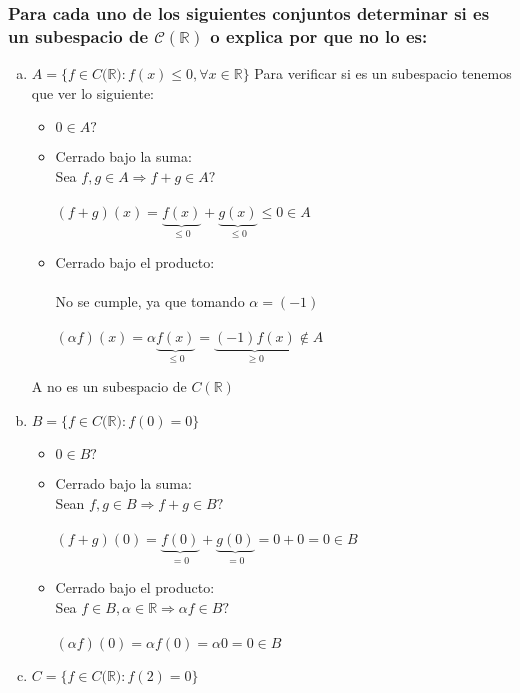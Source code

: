 \documentclass{article}
\begin{document}
\subsubsection{Para cada uno de los siguientes conjuntos determinar si es un subespacio de $\mathcal{C}(\mathbb{R})$ o 
explica por que no lo es: }
\begin{enumerate}[a.]
	\item
		$A = \{ f \in C(\mathbb{R)} : f(x) \leq 0, \forall x \in \mathbb{R} \}$
			Para verificar si es un subespacio tenemos que ver lo siguiente:
			\begin{itemize}
				\item $0 \in A?$
				\item
					Cerrado bajo la suma: \\
					Sea $f,g \in A \Rightarrow f+g \in A?$ \\ \\
					$(f+g)(x) = \underbrace{f(x)}_{\leq 0} + \underbrace{g(x)}_{\leq 0} \leq 0 \in A $
				\item 
					Cerrado bajo el producto: \\ \\
					No se cumple, ya que tomando $\alpha = (-1)$ \\ \\
					$(\alpha f)(x) = \alpha \underbrace{f(x)}_{\leq 0} = \underbrace{(-1)f(x)}_{\geq 0} \not \in A$
			\end{itemize}
			A no es un subespacio de $C(\mathbb{R})$
	\item
		$B = \{ f \in C(\mathbb{R)} : f(0) = 0 \}$
		\begin{itemize}
			\item 
				$0 \in B?$
			\item 
				Cerrado bajo la suma: \\
				Sean $f,g \in B \Rightarrow f+g \in B?$ \\ \\
				$(f+g)(0) = \underbrace{f(0)}_{=0} + \underbrace{g(0)}_{=0} = 0+0 = 0 \in B$
			\item 
				Cerrado bajo el producto: \\
				Sea $f \in B, \alpha \in \mathbb{R} \Rightarrow \alpha f \in B?$ \\ \\
				$(\alpha f)(0) = \alpha f(0) = \alpha 0 = 0 \in B$
		\end{itemize}
	\item
		$C = \{ f \in C(\mathbb{R)} : f(2) = 0 \}$
		\begin{itemize}

\end{itemize}
\end{enumerate}
\end{document}
